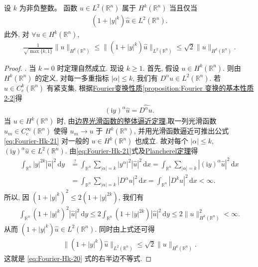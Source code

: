 \documentclass[../../main.tex]{subfiles}
\begin{document}
\begin{theorem}\label{theorem:Fourier刻画Hk}
设 $k$ 为非负整数。
函数 $u\in L^2(\mathbb{R}^n)$ 属于 $H^k(\mathbb{R}^n)$ 当且仅当
\begin{align}\label{eq:Fourier-Hk-19}
(1+|y|^k)\hat{u}\in L^2(\mathbb{R}^n).
\end{align}
此外, 对 $\forall u\in H^k(\mathbb{R}^n)$,
\begin{align}\label{eq:Fourier-Hk-20}
\frac{1}{\sqrt{\max\{k,1\}}}\|u\|_{H^k(\mathbb{R}^n)}\leqslant \|(1+|y|^k)\hat{u}\|_{L^2(\mathbb{R}^n)}\leqslant \sqrt{2}\|u\|_{H^k(\mathbb{R}^n)}.
\end{align}
\end{theorem}
\begin{proof}

{. } 当 $k=0$ 时定理自然成立. 现设 $k\geqslant 1$. 首先, 假设 $u\in H^k(\mathbb{R}^n)$. 则由 $H^k(\mathbb{R}^n)$ 的定义, 对每一多重指标 $|\alpha|\leqslant k$, 我们有 $D^\alpha u\in L^2(\mathbb{R}^n)$. 若 $u\in C_c^k(\mathbb{R}^n)$ 有紧支集, 根据\hyperref[proposition:Fourier 变换的基本性质2]{Fourier变换性质\ref{proposition:Fourier 变换的基本性质2-2}}得
\begin{align}\label{eq:Fourier-Hk-21}
(\text{i}y)^\alpha\hat{u}=\widehat{D^\alpha u}.
\end{align}
当 $u\in H^k(\mathbb{R}^n)$ 时, 由\hyperref[theorem:ch05-直到边界光滑的函数整体逼近定理]{边界光滑函数的整体逼近定理},取一列光滑函数 $u_m\in C_c^\infty(\mathbb{R}^n)$ 使得 $u_m\to u$ 于 $H^k(\mathbb{R}^n)$, 并用光滑函数逼近可推出公式\eqref{eq:Fourier-Hk-21} 对一般的 $u\in H^k(\mathbb{R}^n)$ 也成立. 故对每个 $|\alpha|\leqslant k$, $(\text{i}y)^\alpha\hat{u}\in L^2(\mathbb{R}^n)$. 由\eqref{eq:Fourier-Hk-21}式及\hyperref[theorem:Plancherel定理]{Plancherel定理}得
\begin{align*}
\int_{\mathbb{R} ^n}{|y|^{2k}|\hat{u}|^2\,\mathrm{d}y}&\overset{?}{=}\int_{\mathbb{R} ^n}{\sum_{|\alpha |=k}{\left| y^{\alpha} \right|^2\left| \hat{u} \right|^2\,\mathrm{d}x}}=\int_{\mathbb{R} ^n}{\sum_{|\alpha |=k}{\left| \left( \mathrm{i}y \right) ^{\alpha}\hat{u} \right|^2\,\mathrm{d}x}}
\\
&=\int_{\mathbb{R} ^n}{\sum_{|\alpha |=k}{|D^{\alpha}u|^2\,\mathrm{d}x}}=\int_{\mathbb{R} ^n}{|D^ku|^2\,\mathrm{d}x}<\infty .
\end{align*}
所以, 因 $(1+|y|^k)^2\leqslant 2(1+|y|^{2k})$, 我们有
\begin{align*}
\int_{\mathbb{R}^n}(1+|y|^k)^2|\hat{u}|^2\,\mathrm{d}y
\leqslant 2\int_{\mathbb{R}^n}(1+|y|^{2k})|\hat{u}|^2\,\mathrm{d}y
\leqslant 2\|u\|_{H^k(\mathbb{R}^n)}^2<\infty.
\end{align*}
从而 $(1+|y|^k)\hat{u}\in L^2(\mathbb{R}^n)$. 同时由上式还可得
\begin{align*}
\|(1+|y|^k)\hat{u}\|_{L^2(\mathbb{R}^n)}\leqslant \sqrt{2}\|u\|_{H^k(\mathbb{R}^n)}.
\end{align*}
这就是 \eqref{eq:Fourier-Hk-20} 式的右半边不等式.


\end{proof}
\end{document}
